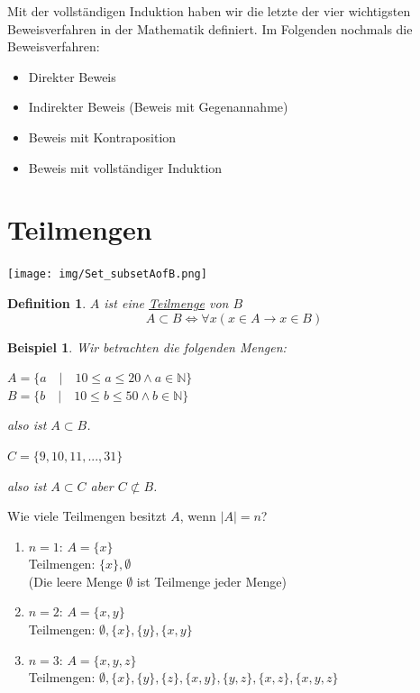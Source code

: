 \documentclass{report}
\newtheorem{mydef}{Definition}
\newtheorem{myexample}{Beispiel}
\begin{document}
Mit der vollständigen Induktion haben wir die letzte der vier wichtigsten Beweisverfahren in der Mathematik definiert. Im Folgenden nochmals die Beweisverfahren:
\begin{itemize}\item Direkter Beweis
\item Indirekter Beweis (Beweis mit Gegenannahme)
\item Beweis mit Kontraposition
\item Beweis mit vollständiger Induktion\end{itemize}
\section{Teilmengen}
\begin{center}\texttt{[image: img/Set\_subsetAofB.png]}\end{center}
\begin{mydef}$A$ ist eine \underline{Teilmenge} von $B$
\begin{equation}A \subset B \iff \forall x(x \in A \to x \in B)\end{equation}\end{mydef}
\begin{myexample}Wir betrachten die folgenden Mengen:
\begin{center}
$A = \{ a \quad | \quad 10 \leq a \leq 20 \land a \in \mathbb{N}\}$\\
$B = \{b \quad | \quad 10 \leq b \leq 50 \land b \in \mathbb{N}\}$\end{center}
also ist $A \subset B$.
\begin{center}$C = \{9, 10, 11, ..., 31\}$\end{center}
also ist $A \subset C$ aber $C \not \subset B$.\end{myexample}
Wie viele Teilmengen besitzt $A$, wenn $|A| = n$?
\begin{enumerate}
\item $n = 1$: $A = \{x\}$ \\
Teilmengen: $\{x\}, \emptyset$\\
(Die leere Menge $\emptyset$ ist Teilmenge jeder Menge)
\item $n = 2$: $A = \{x, y\}$\\
Teilmengen: $\emptyset, \{x\}, \{y\}, \{x, y\}$
\item $n = 3$: $A = \{x, y, z\}$\\
Teilmengen: $\emptyset, \{x\}, \{y\}, \{z\}, \{x, y\}, \{y, z\}, \{x, z\}, \{x, y, z\}$\end{enumerate}
\end{document}
